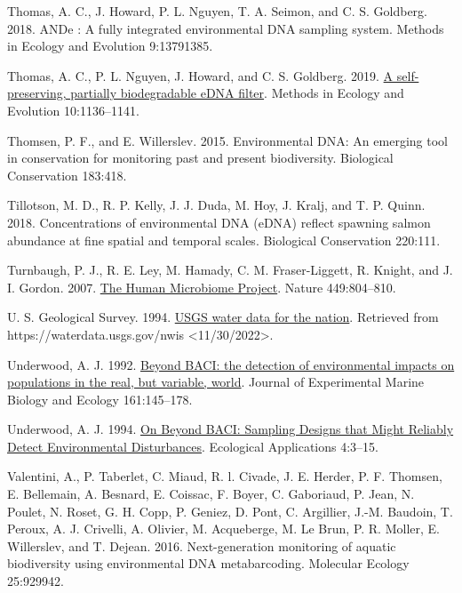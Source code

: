 \documentclass[
]{article}
\newlength{\cslhangindent}
\newlength{\cslentryspacingunit} %
\newenvironment{CSLReferences}[2] %
 {%
  \setlength{\parindent}{0pt}
  \ifodd #1
  \let\oldpar\par
  \def\par{\hangindent=\cslhangindent\oldpar}
  \fi
  \setlength{\parskip}{#2\cslentryspacingunit}
 }%
 {}
\begin{document}
\begin{CSLReferences}{1}{0}
\leavevmode{}%
Thomas, A. C., J. Howard, P. L. Nguyen, T. A. Seimon, and C. S.
Goldberg. 2018. ANDe {\texttrademark}: A fully integrated environmental
DNA sampling system. Methods in Ecology and Evolution 9:13791385.

\leavevmode{}%
Thomas, A. C., P. L. Nguyen, J. Howard, and C. S. Goldberg. 2019.
\href{https://doi.org/10.1111/2041-210X.13212}{A self-preserving,
partially biodegradable eDNA filter}. Methods in Ecology and Evolution
10:1136--1141.

\leavevmode{}%
Thomsen, P. F., and E. Willerslev. 2015. Environmental DNA: An emerging
tool in conservation for monitoring past and present biodiversity.
Biological Conservation 183:418.

\leavevmode{}%
Tillotson, M. D., R. P. Kelly, J. J. Duda, M. Hoy, J. Kralj, and T. P.
Quinn. 2018. Concentrations of environmental DNA (eDNA) reflect spawning
salmon abundance at fine spatial and temporal scales. Biological
Conservation 220:111.

\leavevmode{}%
Turnbaugh, P. J., R. E. Ley, M. Hamady, C. M. Fraser-Liggett, R. Knight,
and J. I. Gordon. 2007. \href{https://doi.org/10.1038/nature06244}{The
Human Microbiome Project}. Nature 449:804--810.

\leavevmode{}%
U. S. Geological Survey. 1994.
\href{https://doi.org/10.5066/F7P55KJN}{USGS water data for the nation}.
Retrieved from https://waterdata.usgs.gov/nwis
\textless11/30/2022\textgreater.

\leavevmode{}%
Underwood, A. J. 1992.
\href{https://doi.org/10.1016/0022-0981(92)90094-Q}{Beyond BACI: the
detection of environmental impacts on populations in the real, but
variable, world}. Journal of Experimental Marine Biology and Ecology
161:145--178.

\leavevmode{}%
Underwood, A. J. 1994. \href{https://doi.org/10.2307/1942110}{On Beyond
BACI: Sampling Designs that Might Reliably Detect Environmental
Disturbances}. Ecological Applications 4:3--15.

\leavevmode{}%
Valentini, A., P. Taberlet, C. Miaud, R. l. Civade, J. E. Herder, P. F.
Thomsen, E. Bellemain, A. Besnard, E. Coissac, F. Boyer, C. Gaboriaud,
P. Jean, N. Poulet, N. Roset, G. H. Copp, P. Geniez, D. Pont, C.
Argillier, J.-M. Baudoin, T. Peroux, A. J. Crivelli, A. Olivier, M.
Acqueberge, M. Le Brun, P. R. Moller, E. Willerslev, and T. Dejean.
2016. Next-generation monitoring of aquatic biodiversity using
environmental DNA metabarcoding. Molecular Ecology 25:929942.


\end{CSLReferences}
\end{document}
